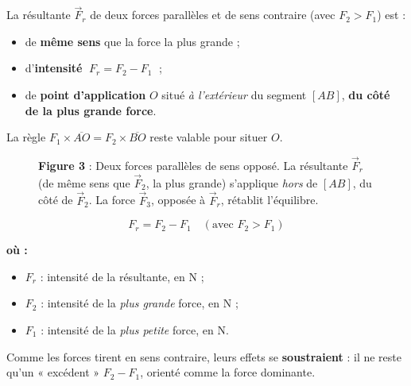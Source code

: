 \documentclass[11pt,a4paper]{article}
\newenvironment{ou}{%
  \par\smallskip\noindent\textbf{où :}\nopagebreak
  \begin{itemize}[leftmargin=1.8em,topsep=2pt,itemsep=1.5pt,parsep=0pt]}%
  {\end{itemize}}
\newcommand{\vv}[1]{\vec{#1}}
\begin{document}
\begin{theoreme}
La résultante $\vv F_r$ de deux forces parallèles et de sens contraire (avec $F_2 > F_1$) est :
\begin{itemize}[leftmargin=1.6em,topsep=2pt,itemsep=2pt]
  \item de \textbf{même sens} que la force la plus grande ;
  \item d'\textbf{intensité} $\;F_r = F_2 - F_1\;$ ;
  \item de \textbf{point d'application} $O$ situé \emph{à l'extérieur} du segment $[AB]$,
        \textbf{du côté de la plus grande force}.
\end{itemize}
La règle $F_1\times\overline{AO} = F_2\times\overline{BO}$ reste valable pour situer $O$.
\end{theoreme}

\begin{figure}[h]
\centering
{}
\caption*{\small\textbf{\textcolor{primary}{Figure 3}} : Deux forces parallèles de sens opposé. La résultante $\vv F_r$ (de même sens que $\vv F_2$, la plus grande) s'applique \emph{hors} de $[AB]$, du côté de $\vv F_2$. La force $\vv F_3$, opposée à $\vv F_r$, rétablit l'équilibre.}
\end{figure}

\begin{formule}
\[
\boxed{\;F_r = F_2 - F_1 \quad (\text{avec } F_2 > F_1)\;}
\]
\begin{ou}
  \item $F_r$ : intensité de la résultante, en \si{\newton} ;
  \item $F_2$ : intensité de la \emph{plus grande} force, en \si{\newton} ;
  \item $F_1$ : intensité de la \emph{plus petite} force, en \si{\newton}.
\end{ou}
Comme les forces tirent en sens contraire, leurs effets se \textbf{soustraient} : il ne reste qu'un
« excédent » $F_2 - F_1$, orienté comme la force dominante.
\end{formule}
\end{document}
